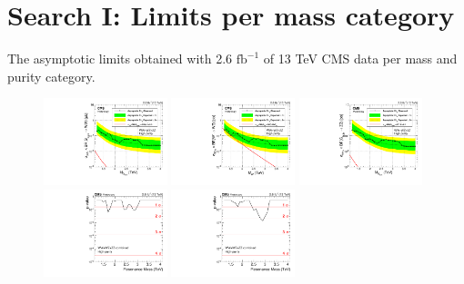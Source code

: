 \chapter{Search I: Limits per mass category}
\label{app:search1}
The asymptotic limits obtained with 2.6 $\textrm{fb}^{-1}$ of 13 TeV CMS data per mass and purity category.

\begin{figure}[h!]
\centering
\includegraphics[width=0.32\textwidth]{figures/analysis/search1/AN-15-211/limits/brazilianFlag_BulkWW_VVHP_new_combined_purity_13TeV_wPDF.pdf}
\includegraphics[width=0.32\textwidth]{figures/analysis/search1/AN-15-211/limits/brazilianFlag_WZ_VVHP_new_combined_purity_13TeV_wPDF.pdf}
\includegraphics[width=0.32\textwidth]{figures/analysis/search1/AN-15-211/limits/brazilianFlag_BulkZZ_VVHP_new_combined_purity_13TeV_wPDF.pdf}\\
\includegraphics[width=0.32\textwidth]{figures/analysis/search1/AN-15-211/pvalues/pvalue_BulkWWinVVnew_high_purity.pdf}
\includegraphics[width=0.32\textwidth]{figures/analysis/search1/AN-15-211/pvalues/pvalue_WZinVVnew_high_purity.pdf}

\end{figure}
